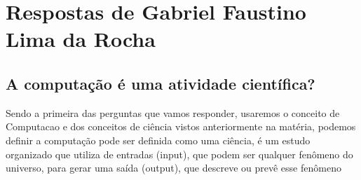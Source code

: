 \section{Respostas de Gabriel Faustino Lima da Rocha}

\subsection{A computação é uma atividade científica?}

Sendo a primeira das perguntas que vamos responder, usaremos o conceito de \gls{Computacao} e dos conceitos de ciência vistos anteriormente na matéria, podemos definir a computação pode ser definida como uma ciência, é um estudo organizado que utiliza de entradas (input), que podem ser qualquer fenômeno do universo, para gerar uma saída (output), que descreve ou prevê esse fenômeno
